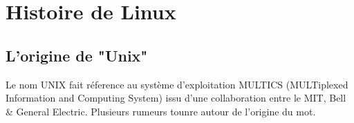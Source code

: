 \documentclass[10pt]{article}
\begin{document}
\newpage
\section{Histoire de Linux}
\subsection{L'origine de "Unix"}
Le nom UNIX fait réference au syst\`eme d'exploitation MULTICS (MULTiplexed
Information and Computing System) issu d'une collaboration entre le MIT, Bell
\& General Electric.
Plusieurs rumeurs tounre autour de l'origine du mot.\\
\end{document}
